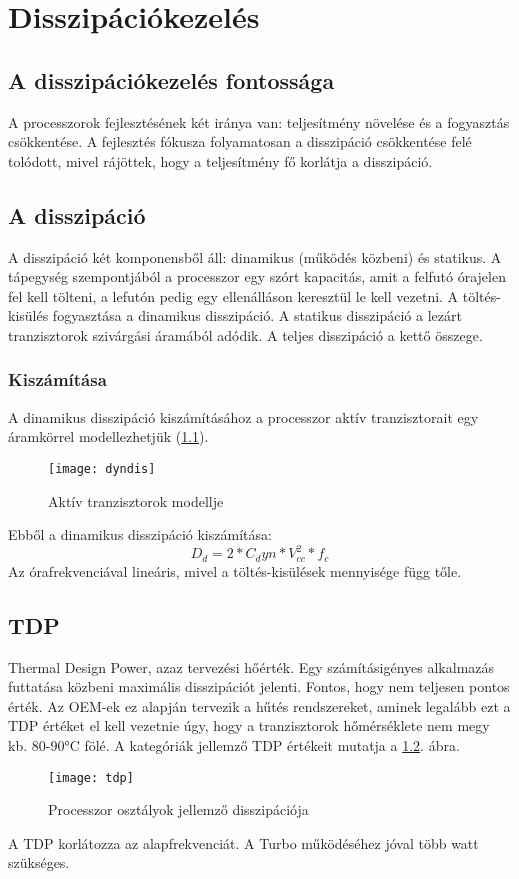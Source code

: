 
\chapter{Disszipációkezelés}

\section{A disszipációkezelés fontossága}
A processzorok fejlesztésének két iránya van: teljesítmény növelése és a fogyasztás csökkentése.
A fejlesztés fókusza folyamatosan a disszipáció csökkentése felé tolódott, mivel rájöttek, hogy a teljesítmény fő korlátja a disszipáció.

\section{A disszipáció}
A disszipáció két komponensből áll: dinamikus (működés közbeni) és statikus.
A tápegység szempontjából a processzor egy szórt kapacitás, amit a felfutó órajelen fel kell tölteni, a lefutón pedig egy ellenálláson keresztül le kell vezetni.
A töltés-kisülés fogyasztása a dinamikus disszipáció.
A statikus disszipáció a lezárt tranzisztorok szivárgási áramából adódik.
A teljes disszipáció a kettő összege.

\subsection{Kiszámítása}
A dinamikus disszipáció kiszámításához a processzor aktív tranzisztorait egy áramkörrel modellezhetjük (\ref{fig:dyndis}).
\begin{figure}[H]
    \texttt{[image: dyndis]}
    \centering
    \caption{Aktív tranzisztorok modellje}
    \label{fig:dyndis}
\end{figure}
Ebből a dinamikus disszipáció kiszámítása:
\begin{equation}
    D_d=2*C_dyn*V_{cc}^2*f_c
\end{equation}
Az órafrekvenciával lineáris, mivel a töltés-kisülések mennyisége függ tőle.

\section{TDP}
Thermal Design Power, azaz tervezési hőérték.
Egy számításigényes alkalmazás futtatása közbeni maximális disszipációt jelenti.
Fontos, hogy nem teljesen pontos érték.
Az OEM-ek ez alapján tervezik a hűtés rendszereket, aminek legalább ezt a TDP értéket el kell vezetnie úgy, hogy a tranzisztorok hőmérséklete nem megy kb. 80-90°C fölé.
A kategóriák jellemző TDP értékeit mutatja a \ref{fig:tdp}. ábra.
\begin{figure}[H]
    \texttt{[image: tdp]}
    \centering
    \caption{Processzor osztályok jellemző disszipációja}
    \label{fig:tdp}
\end{figure}
A TDP korlátozza az alapfrekvenciát.
A Turbo működéséhez jóval több watt szükséges.

